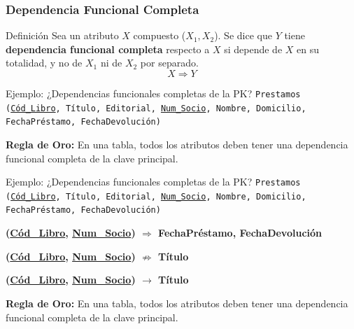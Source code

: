 \documentclass{beamer}
\begin{document}
\begin{frame}
  \frametitle{Dependencia Funcional Completa}
  \begin{block}{Definición}
    Sea un atributo $X$ compuesto ($X_1, X_2$). Se dice que $Y$ tiene \textbf{dependencia funcional completa} respecto a $X$ si depende de $X$ en su totalidad, y no de $X_1$ ni de $X_2$ por separado.
    $$ X \Rightarrow Y $$
  \end{block}

  \begin{exampleblock}{Ejemplo: ¿Dependencias funcionales completas de la PK?}
    \texttt{Prestamos (\underline{Cód\_Libro}, Título, Editorial, \underline{Num\_Socio}, Nombre, Domicilio, FechaPréstamo, FechaDevolución)} 

  \end{exampleblock}
  
  \textbf{Regla de Oro:} En una tabla, todos los atributos deben tener una dependencia funcional completa de la clave principal.
\end{frame}

\begin{frame}
  \begin{exampleblock}{Ejemplo: ¿Dependencias funcionales completas de la PK?}
    \texttt{Prestamos (\underline{Cód\_Libro}, Título, Editorial, \underline{Num\_Socio}, Nombre, Domicilio, FechaPréstamo, FechaDevolución)} 

    \textbf{(\underline{Cód\_Libro}, \underline{Num\_Socio}) $\Rightarrow$ FechaPréstamo, FechaDevolución}

    \textbf{(\underline{Cód\_Libro}, \underline{Num\_Socio}) $\not\Rightarrow$ Título}

    \textbf{(\underline{Cód\_Libro}, \underline{Num\_Socio}) $\rightarrow$ Título}
  \end{exampleblock}
  
  \textbf{Regla de Oro:} En una tabla, todos los atributos deben tener una dependencia funcional completa de la clave principal.
\end{frame}
\end{document}
